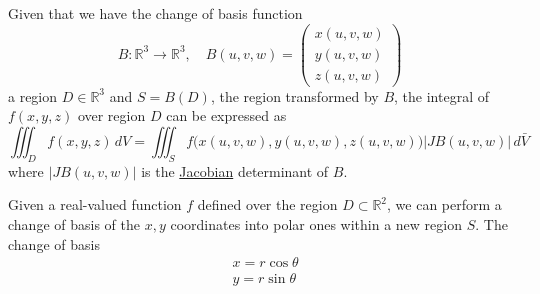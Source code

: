   \begin{theorem}
    \label{thm:integration-over-change-of-bases-in-r3}
  Given that we have the change of basis function 
  \begin{equation}
    B: \mathbb{R}^3 \to \mathbb{R}^3, \quad B(u, v, w) = \begin{pmatrix} x(u, v, w) \\ y(u, v, w) \\ z(u, v, w) \end{pmatrix}
  \end{equation}
  a region $D \in \mathbb{R}^3$ and $S = B(D)$, the region transformed by $B$, the integral of $f(x, y, z)$ over region $D$ can be expressed as 
  \begin{equation}
    \iiint_D f(x, y, z)\, dV = \iiint_S f\big( x(u, v, w), y(u, v ,w), z(u, v, w) \big) \big| J B (u, v, w)\big| \, d \bar{V}
  \end{equation}
  where $\big| J B (u, v, w)\big|$ is the \hyperref[def:jacobian]{Jacobian} determinant of $B$. 
  \end{theorem}

  \begin{example}
    \label{ex:iterated-integral-over-a-simple-region}
  Given a real-valued function $f$ defined over the region $D \subset \mathbb{R}^2$, we can perform a change of basis of the $x, y$ coordinates into polar ones within a new region $S$. The change of basis 
  \begin{align*}
      & x = r \cos{\theta} \\
      & y = r \sin{\theta} 
  \end{align*}
  \begin{center}
  \end{center}
  \end{example}

